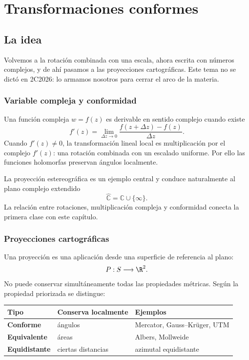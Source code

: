 \chapter{Transformaciones conformes}\label{cap:10}

\section{La idea}

Volvemos a la rotación combinada con una escala, ahora escrita con números complejos, y de ahí pasamos a las proyecciones cartográficas. Este tema no se dictó en 2C2026: lo armamos nosotros para cerrar el arco de la materia.

\subsection{Variable compleja y conformidad}

Una función compleja \(w=f(z)\) es derivable en sentido complejo cuando existe
\[
  f'(z)=\lim_{\Delta z\to0}
  \frac{f(z+\Delta z)-f(z)}{\Delta z}.
\]
Cuando \(f'(z)\neq0\), la transformación lineal local es multiplicación por el complejo
\(f'(z)\): una rotación combinada con un escalado uniforme. Por ello las funciones holomorfas
preservan ángulos localmente.

La proyección estereográfica es un ejemplo central y conduce naturalmente al plano complejo
extendido
\[
  \widehat{\mathbb C}=\mathbb C\cup\{\infty\}.
\]
La relación entre rotaciones, multiplicación compleja y conformidad conecta la primera clase
con este capítulo.

\subsection{Proyecciones cartográficas}\label{sec:proyecciones}

Una proyección es una aplicación desde una superficie de referencia al plano:
\[
  P:S\longrightarrow\R^2.
\]
No puede conservar simultáneamente todas las propiedades métricas. Según la propiedad
priorizada se distingue:

\begin{center}
\begin{tabularx}{.92\textwidth}{>{\bfseries}l X X}
\toprule
Tipo & Conserva localmente & Ejemplos\\
\midrule
Conforme & ángulos & Mercator, Gauss--Krüger, UTM\\
Equivalente & áreas & Albers, Mollweide\\
Equidistante & ciertas distancias & azimutal equidistante\\
\bottomrule
\end{tabularx}
\end{center}

